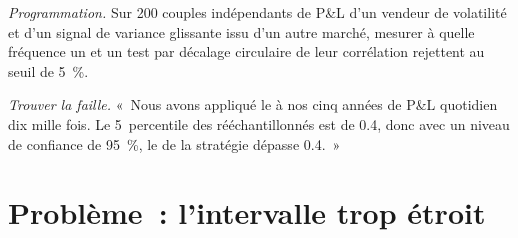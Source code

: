 \begin{exercise}[$\star\star\star$]\label{exo:qm:resampling:7}
\emph{Programmation.} Sur 200 couples indépendants de P\&L d'un vendeur de volatilité et d'un signal de variance glissante issu d'un autre marché, mesurer à quelle fréquence
un  et un test par décalage circulaire de leur corrélation rejettent au seuil de 5~\%.
\end{exercise}

\begin{exercise}[$\star\star\star$]\label{exo:qm:resampling:8}
\emph{Trouver la faille.} «~Nous avons appliqué le  à nos cinq années de P\&L quotidien dix mille fois. Le 5~percentile des  rééchantillonnés
est de 0.4, donc avec un niveau de confiance de 95~\%, le  de la stratégie dépasse 0.4.~»
\end{exercise}

\section{Problème~: l'intervalle trop étroit}

